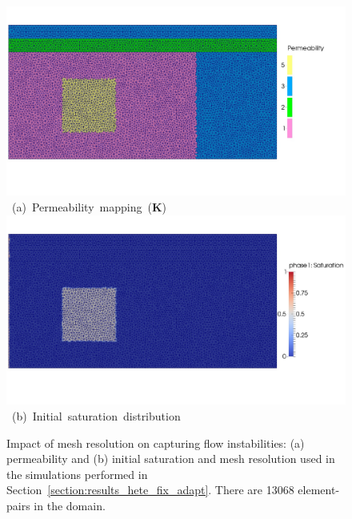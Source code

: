 \begin{figure}[ht] 
\vbox{
\hbox{\hspace{1cm}
\includegraphics[width=\textwidth]{./Pics1/Section4_4/Five_regions_adapt_MeshPerm.pdf}}
\vspace{-1.0cm}
\hbox{\hspace{3.5cm} (a) Permeability mapping ({\bf K})}
\vspace{0.0cm}
\hbox{\hspace{1cm}
\includegraphics[width=\textwidth]{./Pics1/Section4_4/Five_regions_adapt_MeshSat1.pdf}}
\vspace{-1.0cm}
\hbox{\hspace{3.5cm} (b) Initial saturation distribution}}
\caption{Impact of mesh resolution on capturing flow instabilities: (a) permeability and (b) initial saturation and  mesh resolution used in the simulations performed in Section~\ref{section:results_hete_fix_adapt}. There are 13068  element-pairs in the domain.}
\label{fig:testcase_heter_domain}
\end{figure}
\clearpage


